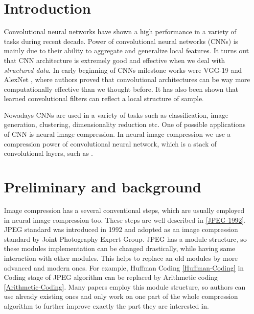 \chapter{Introduction}

Convolutional neural networks have shown a high performance in a variety of tasks during recent decade. Power of convolutional neural networks (CNNs) is mainly due to their ability to aggregate and generalize local features. It turns out that CNN architecture is extremely good and effective when we deal with \textit{structured data}. In early beginning of CNNs milestone works were VGG-19 \cite{Simonyan_Zisserman_2015} and AlexNet \cite{Krizhevsky_Sutskever_Hinton_2017}, where authors proved that convolutional architectures can be way more computationally effective than we thought before. It has also been shown that learned convolutional filters can reflect a local structure of sample.

Nowadays CNNs are used in a variety of tasks such as classification,  image generation, clustering, dimensionality reduction etc. One of possible applications of CNN is neural image compression. In neural image compression we use a compression power of convolutional neural network, which is a stack of convolutional layers, such as \cite{Krizhevsky_Sutskever_Hinton_2017}.

\chapter{Preliminary and background}

Image compression has a several conventional steps, which are usually employed in neural image compression too. These steps are well described in \ref{JPEG-1992}. JPEG standard was introduced in 1992 and adopted as an image compression standard by Joint Photography Expert Group. JPEG has a module structure, so these modules implementation can be changed drastically, while having same interaction with other modules. This helps to replace an old modules by more advanced and modern ones. For example, Huffman Coding \ref{Huffman-Coding} in Coding stage of JPEG algorithm can be replaced by Arithmetic coding \ref{Arithmetic-Coding}. Many papers employ this module structure, so authors can use already existing ones and only work on one part of the whole compression algorithm to further improve exactly the part they are interested in.

